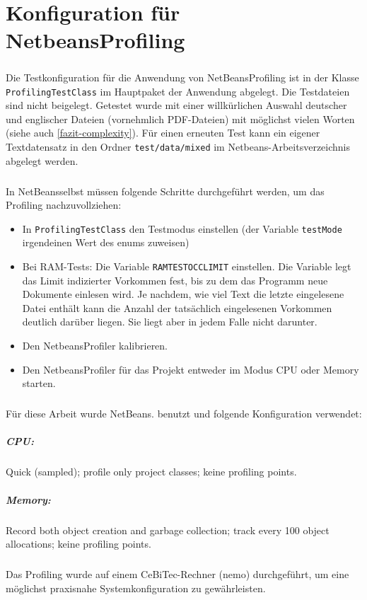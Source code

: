 
\chapter{Konfiguration für Netbeans\texttrademark Profiling}
\label{profiling}

\paragraph{} Die Testkonfiguration für die Anwendung von NetBeans\texttrademark Profiling ist in der Klasse \texttt{ProfilingTestClass} im Hauptpaket der Anwendung abgelegt. Die Testdateien sind nicht beigelegt. Getestet wurde mit einer willkürlichen Auswahl deutscher und englischer Dateien (vornehmlich PDF-Dateien) mit möglichst vielen Worten (siehe auch \ref{fazit-complexity}). Für einen erneuten Test kann ein eigener Textdatensatz in den Ordner \texttt{test/data/mixed} im Netbeans-Arbeitsverzeichnis abgelegt werden.
\paragraph{} In NetBeans\texttrademark selbst müssen folgende Schritte durchgeführt werden, um das Profiling nachzuvollziehen:
\begin{itemize}
 \item In \texttt{ProfilingTestClass} den Testmodus einstellen (der Variable \texttt{testMode} irgendeinen Wert des enums zuweisen)
 \item Bei RAM-Tests: Die Variable \texttt{RAMTESTOCCLIMIT} einstellen. Die Variable legt das Limit indizierter Vorkommen fest, bis zu dem das Programm neue Dokumente einlesen wird. Je nachdem, wie viel Text die letzte eingelesene Datei enthält kann die Anzahl der tatsächlich eingelesenen Vorkommen deutlich darüber liegen. Sie liegt aber in jedem Falle nicht darunter.
 \item Den Netbeans\texttrademark Profiler kalibrieren.
 \item Den Netbeans\texttrademark Profiler für das Projekt entweder im Modus CPU oder Memory starten.
\end{itemize}
\paragraph{} Für diese Arbeit wurde NetBeans. benutzt und folgende Konfiguration verwendet:
\paragraph{CPU:} Quick (sampled); profile only project classes; keine profiling points.
\paragraph{Memory:} Record both object creation and garbage collection; track every 100 object allocations; keine profiling points.
\paragraph{} Das Profiling wurde auf einem CeBiTec-Rechner (nemo) durchgeführt, um eine möglichst praxisnahe Systemkonfiguration zu gewährleisten.